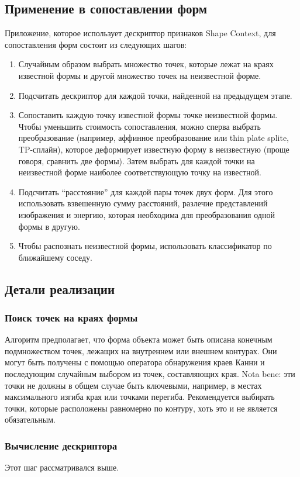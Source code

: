 \subsection{Применение в сопоставлении форм}
Приложение, которое использует дескриптор признаков Shape Context, для сопоставления форм состоит из следующих шагов:
\begin{enumerate}
  \item Случайным образом выбрать множество точек, которые лежат на краях известной формы и другой множество точек на неизвестной форме.
  \item Подсчитать дескриптор для каждой точки, найденной на предыдущем этапе.
  \item Сопоставить каждую точку известной формы точке неизвестной формы. Чтобы уменьшить стоимость сопоставления, можно сперва выбрать преобразование (например, аффинное преобразование или thin plate splite, TP-сплайн), которое деформирует известную форму в неизвестную (проще говоря, сравнить две формы). Затем выбрать для каждой точки на неизвестной форме наиболее соответствующую точку на известной.
  \item Подсчитать ``расстояние'' для каждой пары точек двух форм. Для этого использовать взвешенную сумму расстояний, разлечие представлений изображения и энергию, которая необходима для преобразования одной формы в другую.
  \item Чтобы распознать неизвестной формы, использовать классификатор по ближайшему соседу.
\end{enumerate}

\subsection{Детали реализации}
\subsubsection{Поиск точек на краях формы}
Алгоритм предполагает, что форма объекта может быть описана конечным подмножеством точек, лежащих на внутреннем или внешнем контурах. Они могут быть получены с помощью оператора обнаружения краев Канни и последующим случайным выбором из точек, составляющих края. Nota bene: эти точки не должны в общем случае быть ключевыми, например, в местах максимального изгиба края или точками перегиба. Рекомендуется выбирать точки, которые расположены равномерно по контуру, хоть это и не является обязательным.

\subsubsection{Вычисление дескриптора}
Этот шаг рассматривался выше.

